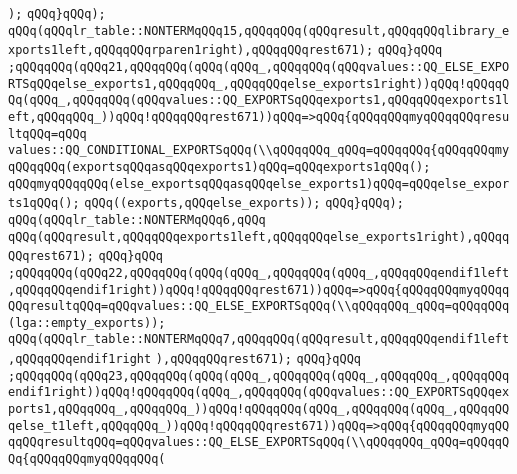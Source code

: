 \verb|);|\newline
\verb|qQQq}qQQq);|\newline
\verb|qQQq(qQQqlr_table::NONTERMqQQq15,qQQqqQQq(qQQqresult,qQQqqQQqlibrary_exports1left,qQQqqQQqrparen1right),qQQqqQQqrest671);|\newline
\verb|qQQq}qQQq|\newline
\verb|;qQQqqQQq(qQQq21,qQQqqQQq(qQQq(qQQq_,qQQqqQQq(qQQqvalues::QQ_ELSE_EXPORTSqQQqelse_exports1,qQQqqQQq_,qQQqqQQqelse_exports1right))qQQq!qQQqqQQq(qQQq_,qQQqqQQq(qQQqvalues::QQ_EXPORTSqQQqexports1,qQQqqQQqexports1left,qQQqqQQq_))qQQq!qQQqqQQqrest671))qQQq=>qQQq{qQQqqQQqmyqQQqqQQqresultqQQq=qQQq|\newline
\verb|values::QQ_CONDITIONAL_EXPORTSqQQq(\\qQQqqQQq_qQQq=qQQqqQQq{qQQqqQQqmyqQQqqQQq(exportsqQQqasqQQqexports1)qQQq=qQQqexports1qQQq();|\newline
\verb|qQQqmyqQQqqQQq(else_exportsqQQqasqQQqelse_exports1)qQQq=qQQqelse_exports1qQQq();|\newline
\verb|qQQq((exports,qQQqelse_exports));|\newline
\verb|qQQq}qQQq);|\newline
\verb|qQQq(qQQqlr_table::NONTERMqQQq6,qQQq|\newline
\verb|qQQq(qQQqresult,qQQqqQQqexports1left,qQQqqQQqelse_exports1right),qQQqqQQqrest671);|\newline
\verb|qQQq}qQQq|\newline
\verb|;qQQqqQQq(qQQq22,qQQqqQQq(qQQq(qQQq_,qQQqqQQq(qQQq_,qQQqqQQqendif1left,qQQqqQQqendif1right))qQQq!qQQqqQQqrest671))qQQq=>qQQq{qQQqqQQqmyqQQqqQQqresultqQQq=qQQqvalues::QQ_ELSE_EXPORTSqQQq(\\qQQqqQQq_qQQq=qQQqqQQq(lga::empty_exports));|\newline
\verb|qQQq(qQQqlr_table::NONTERMqQQq7,qQQqqQQq(qQQqresult,qQQqqQQqendif1left,qQQqqQQqendif1right|\newline
\verb|),qQQqqQQqrest671);|\newline
\verb|qQQq}qQQq|\newline
\verb|;qQQqqQQq(qQQq23,qQQqqQQq(qQQq(qQQq_,qQQqqQQq(qQQq_,qQQqqQQq_,qQQqqQQqendif1right))qQQq!qQQqqQQq(qQQq_,qQQqqQQq(qQQqvalues::QQ_EXPORTSqQQqexports1,qQQqqQQq_,qQQqqQQq_))qQQq!qQQqqQQq(qQQq_,qQQqqQQq(qQQq_,qQQqqQQqelse_t1left,qQQqqQQq_))qQQq!qQQqqQQqrest671))qQQq=>qQQq{qQQqqQQqmyqQQqqQQqresultqQQq=qQQqvalues::QQ_ELSE_EXPORTSqQQq(\\qQQqqQQq_qQQq=qQQqqQQq{qQQqqQQqmyqQQqqQQq(|\newline
